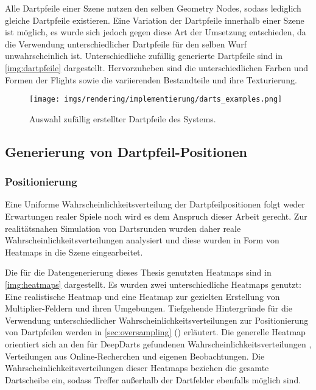 \vspace{\baselineskip}

Alle Dartpfeile einer Szene nutzen den selben Geometry Nodes, sodass lediglich gleiche Dartpfeile existieren. Eine Variation der Dartpfeile innerhalb einer Szene ist möglich, es wurde sich jedoch gegen diese Art der Umsetzung entschieden, da die Verwendung unterschiedlicher Dartpfeile für den selben Wurf unwahrscheinlich ist. Unterschiedliche zufällig generierte Dartpfeile sind in \autoref{img:dartpfeile} dargestellt. Hervorzuheben sind die unterschiedlichen Farben und Formen der Flights sowie die variierenden Bestandteile und ihre Texturierung.

\begin{figure}
    \centering
    \texttt{[image: imgs/rendering/implementierung/darts\_examples.png]}
    \caption{Auswahl zufällig erstellter Dartpfeile des Systems.}
    \label{img:dartpfeile}
\end{figure}

\subsection{Generierung von Dartpfeil-Positionen}  %
\label{sec:wie_dartpfeil_positionen}

\subsubsection{Positionierung}
\label{sec:dartpfeil_positionierung}

Eine Uniforme Wahrscheinlichkeitsverteilung der Dartpfeilpositionen folgt weder Erwartungen realer Spiele noch wird es dem Anspruch dieser Arbeit gerecht. Zur realitätsnahen Simulation von Dartsrunden wurden daher reale Wahrscheinlichkeitsverteilungen analysiert und diese wurden in Form von Heatmaps in die Szene eingearbeitet.

Die für die Datengenerierung dieses Thesis genutzten Heatmaps sind in \autoref{img:heatmaps} dargestellt. Es wurden zwei unterschiedliche Heatmaps genutzt: Eine realistische Heatmap und eine Heatmap zur gezielten Erstellung von Multiplier-Feldern und ihren Umgebungen. Tiefgehende Hintergründe für die Verwendung unterschiedlicher Wahrscheinlichkeitsverteilungen zur Positionierung von Dartpfeilen werden in \autoref{sec:oversampling} () erläutert. Die generelle Heatmap orientiert sich an den für DeepDarts gefundenen Wahrscheinlichkeitsverteilungen \cite{deepdarts}, Verteilungen aus Online-Recherchen \cite{heatmap} und eigenen Beobachtungen. Die Wahrscheinlichkeitsverteilungen dieser Heatmaps beziehen die gesamte Dartscheibe ein, sodass Treffer außerhalb der Dartfelder ebenfalls möglich sind.

